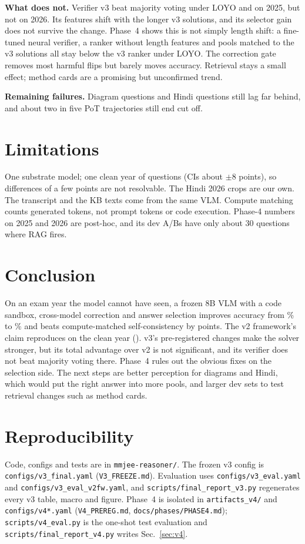 \documentclass[conference]{IEEEtran}
\begin{document}
\textbf{What does not.} Verifier v3 beat majority voting under LOYO and on 2025, but not on 2026.
Its features shift with the longer v3 solutions, and its selector gain does not survive the
change. Phase~4 shows this is not simply length shift: a fine-tuned neural verifier, a ranker
without length features and pools matched to the v3 solutions all stay below the v3 ranker under
LOYO. The correction gate removes most harmful flips but barely moves accuracy. Retrieval stays a
small effect; method cards are a promising but unconfirmed trend.

\textbf{Remaining failures.} Diagram questions and Hindi questions still lag far behind, and
about two in five PoT trajectories still end cut off.

\section{Limitations}
One substrate model; one clean year of \NTest{} questions (CIs about $\pm$8 points), so
differences of a few points are not resolvable. The Hindi 2026 crops are our own. The transcript
and the KB texts come from the same VLM. Compute matching counts generated tokens, not prompt
tokens or code execution. Phase-4 numbers on 2025 and 2026 are post-hoc, and its dev A/Bs have
only about 30 questions where RAG fires.

\section{Conclusion}
On an exam year the model cannot have seen, a frozen 8B VLM with a code sandbox, cross-model
correction and answer selection improves accuracy from \ThreeBase\% to \ThreeAcc\% and beats
compute-matched self-consistency by \ThreeVsSc{} points. The v2 framework's claim reproduces on
the clean year (\TwoVsSc). v3's pre-registered changes make the solver stronger, but its total
advantage over v2 is not significant, and its verifier does not beat majority voting there.
Phase~4 rules out the obvious fixes on the selection side. The next steps are better perception
for diagrams and Hindi, which would put the right answer into more pools, and larger dev sets to
test retrieval changes such as method cards.

\section*{Reproducibility}
Code, configs and tests are in \texttt{mmjee-reasoner/}. The frozen v3 config is
\texttt{configs/v3\_final.yaml} (\texttt{V3\_FREEZE.md}). Evaluation uses
\texttt{configs/v3\_eval.yaml} and \texttt{configs/v3\_eval\_v2fw.yaml}, and
\texttt{scripts/final\_report\_v3.py} regenerates every v3 table, macro and figure. Phase~4 is
isolated in \texttt{artifacts\_v4/} and \texttt{configs/v4*.yaml} (\texttt{V4\_PREREG.md},
\texttt{docs/phases/PHASE4.md}); \texttt{scripts/v4\_eval.py} is the
one-shot test evaluation and \texttt{scripts/final\_report\_v4.py} writes Sec.~\ref{sec:v4}.
\end{document}
